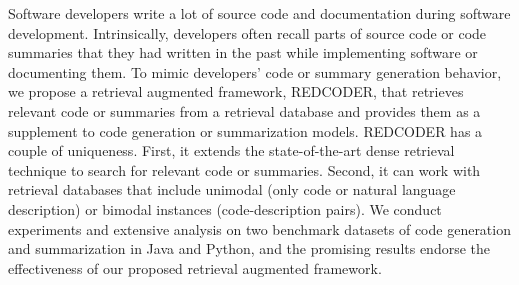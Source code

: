 Software developers write a lot of source code and documentation during software development. Intrinsically, developers often recall parts of source code or code summaries that they had written in the past while implementing software or documenting them. To mimic developers' code or summary generation behavior, we propose a retrieval augmented framework, REDCODER, that retrieves relevant code or summaries from a retrieval database and provides them as a supplement to code generation or summarization models. REDCODER has a couple of uniqueness. First, it extends the state-of-the-art dense retrieval technique to search for relevant code or summaries. Second, it can work with retrieval databases that include unimodal (only code or natural language description) or bimodal instances (code-description pairs). We conduct experiments and extensive analysis on two benchmark datasets of code generation and summarization in Java and Python, and the promising results endorse the effectiveness of our proposed retrieval augmented framework.
